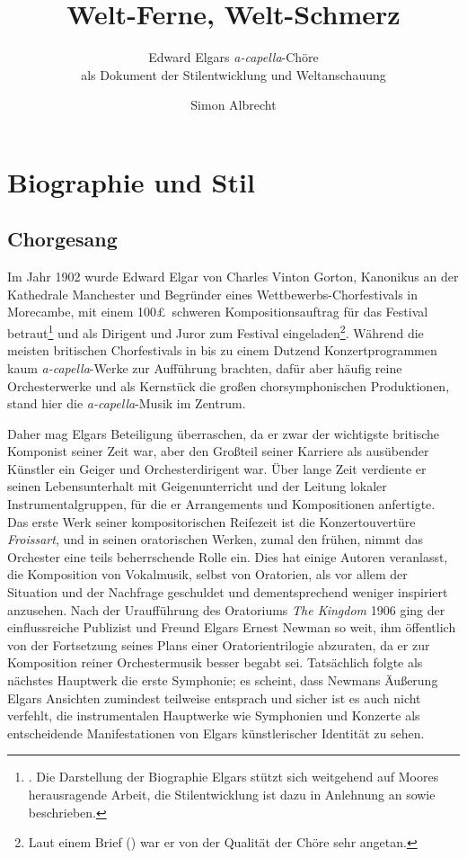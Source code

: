 \documentclass[a4paper,11pt,open=any]{scrbook}
\author{Simon Albrecht}
\title{Welt-Ferne, Welt-Schmerz}
\subtitle{
Edward Elgars \textit{a-capella}-Chöre \\
als Dokument der Stilentwicklung und Weltanschauung
}
\begin{document}
\maketitle

\tableofcontents

\chapter{Biographie und Stil}

\section{Chorgesang}
Im Jahr 1902 wurde Edward Elgar von Charles Vinton Gorton, Kanonikus an der
Kathedrale Manchester und Begründer eines Wettbewerbs-Chorfestivals in Morecambe,
mit einem 100\pounds\ schweren Kompositionsauftrag für das Festival
betraut\footnote{\cite[S.~376]{moore}.  Die Darstellung der Biographie
Elgars stützt sich weitgehend auf Moores herausragende Arbeit, die
Stilentwicklung ist dazu in Anlehnung an \cite[S.~12–24]{harperscott2006}
sowie \cite{butt-rcath} beschrieben.} und als Dirigent und Juror zum Festival
eingeladen\footnote{\cite[S.~viii.]{ece13}  Laut einem Brief (\cite[S.~128f.]{elgar-letters})
war er von der Qualität der Chöre sehr angetan.}.  Während die meisten
britischen Chorfestivals in bis zu einem Dutzend Konzertprogrammen kaum \textit{a-capella}-Werke
zur Aufführung brachten, dafür aber häufig reine Orchesterwerke und als
Kernstück die großen chorsymphonischen Produktionen, stand hier die \textit{a-capella}-Musik
im Zentrum.

Daher mag Elgars Beteiligung überraschen, da er zwar der wichtigste britische
Komponist seiner Zeit war, aber den Großteil seiner Karriere als ausübender
Künstler ein Geiger und Orchesterdirigent war.  Über lange Zeit verdiente
er seinen Lebensunterhalt mit Geigenunterricht und der Leitung lokaler
Instrumentalgruppen, für die er Arrangements und Kompositionen anfertigte.
Das erste Werk seiner kompositorischen Reifezeit ist die Konzertouvertüre
\textit{Froissart}, und in seinen oratorischen Werken, zumal den frühen,
nimmt das Orchester eine teils beherrschende Rolle ein.  Dies hat einige
Autoren veranlasst, die Komposition von Vokalmusik, selbst von Oratorien,
als vor allem der Situation und der Nachfrage geschuldet und dementsprechend
weniger inspiriert anzusehen.  Nach der Uraufführung des Oratoriums \textit{The
Kingdom} 1906 ging der einflussreiche Publizist und Freund Elgars Ernest
Newman so weit, ihm öffentlich von der Fortsetzung seines Plans einer
Oratorientrilogie abzuraten\cite[S.~507]{moore}, da er zur Komposition
reiner Orchestermusik besser begabt sei.  Tatsächlich folgte als nächstes
Hauptwerk die erste Symphonie; es scheint, dass Newmans Äußerung Elgars
Ansichten zumindest teilweise entsprach und sicher ist es auch nicht
verfehlt, die instrumentalen Hauptwerke wie Symphonien und Konzerte als
entscheidende Manifestationen von Elgars künstlerischer Identität zu sehen.
\end{document}
